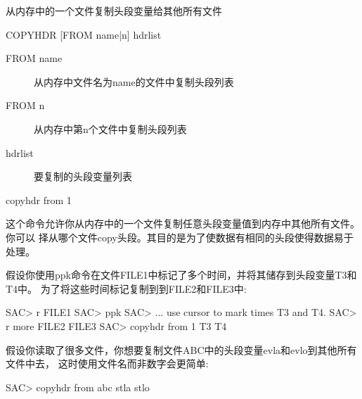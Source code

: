 \label{cmd:copyhdr}

从内存中的一个文件复制头段变量给其他所有文件

\begin{SACSTX}
COPYHDR [FROM name|n] hdrlist
\end{SACSTX}

\begin{description}
\item [FROM name] 从内存中文件名为name的文件中复制头段列表
\item [FROM n] 从内存中第n个文件中复制头段列表 
\item [hdrlist] 要复制的头段变量列表
\end{description}

\begin{SACDFT}
copyhdr from 1
\end{SACDFT}

这个命令允许你从内存中的一个文件复制任意头段变量值到内存中其他所有文件。你可以
择从哪个文件copy头段。其目的是为了使数据有相同的头段使得数据易于处理。

假设你使用ppk命令在文件FILE1中标记了多个时间，并将其储存到头段变量T3和T4中。
为了将这些时间标记复制到到FILE2和FILE3中:
\begin{SACCode}
SAC> r FILE1
SAC> ppk
SAC> ... use cursor to mark times T3 and T4.
SAC> r more FILE2 FILE3
SAC> copyhdr from 1 T3 T4
\end{SACCode}

假设你读取了很多文件，你想要复制文件ABC中的头段变量evla和evlo到其他所有文件中去，
这时使用文件名而非数字会更简单:
\begin{SACCode}
SAC> copyhdr from abc stla stlo
\end{SACCode}

